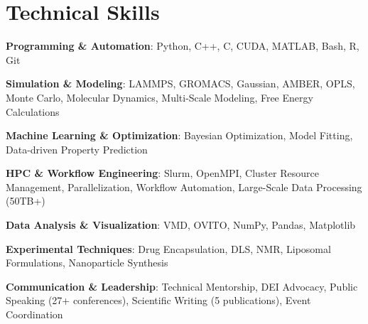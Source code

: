 \section*{Technical Skills}
\begin{tabitemize}
  \item \textbf{Programming \& Automation}: Python, C++, C, CUDA, MATLAB, Bash, R, Git
  \item \textbf{Simulation \& Modeling}: LAMMPS, GROMACS, Gaussian, AMBER, OPLS, Monte Carlo, Molecular Dynamics, Multi-Scale Modeling, Free Energy Calculations
  \item \textbf{Machine Learning \& Optimization}: Bayesian Optimization, Model Fitting, Data-driven Property Prediction
  \item \textbf{HPC \& Workflow Engineering}: Slurm, OpenMPI, Cluster Resource Management, Parallelization, Workflow Automation, Large-Scale Data Processing (50TB+)
  \item \textbf{Data Analysis \& Visualization}: VMD, OVITO, NumPy, Pandas, Matplotlib
  \item \textbf{Experimental Techniques}: Drug Encapsulation, DLS, NMR, Liposomal Formulations, Nanoparticle Synthesis
  \item \textbf{Communication \& Leadership}: Technical Mentorship, DEI Advocacy, Public Speaking (27+ conferences), Scientific Writing (5 publications), Event Coordination
\end{tabitemize}
